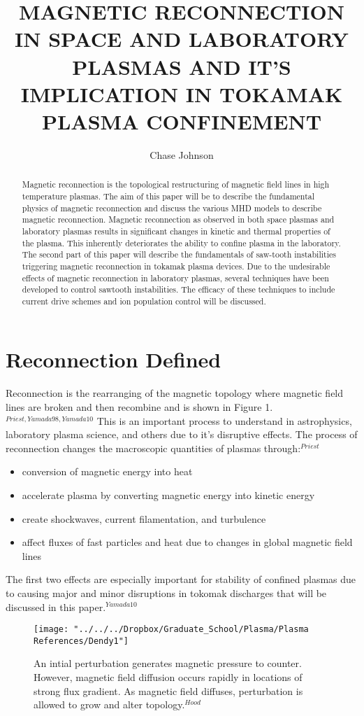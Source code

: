 \documentclass{article}
\begin{document}
\title{MAGNETIC RECONNECTION IN SPACE AND LABORATORY PLASMAS AND IT’S IMPLICATION IN TOKAMAK PLASMA CONFINEMENT}
\author{Chase Johnson}

\maketitle

\begin{abstract}
Magnetic reconnection is the topological restructuring of magnetic field lines in high temperature plasmas.    The aim of this paper will be to describe the fundamental physics of magnetic reconnection and discuss the various MHD models to describe magnetic reconnection.  Magnetic reconnection as observed in both space plasmas and laboratory plasmas results in significant changes in kinetic and thermal properties of the plasma.  This inherently deteriorates the ability to confine plasma in the laboratory.  The second part of this paper will describe the fundamentals of saw-tooth instabilities triggering magnetic reconnection in tokamak plasma devices.  Due to the undesirable effects of magnetic reconnection in laboratory plasmas, several techniques have been developed to control sawtooth instabilities.  The efficacy of these techniques to include current drive schemes and ion population control will be discussed.
\end{abstract}
\section{Reconnection Defined}
Reconnection is the rearranging of the magnetic topology where magnetic field lines are broken and then recombine and is shown in Figure 1.$^{Priest,Yamada98,Yamada10}$  This is an important process to understand in astrophysics, laboratory plasma science, and others due to it's disruptive effects.  The process of reconnection changes the macroscopic quantities of plasmas through:$^{Priest}$
\begin{itemize}
\item conversion of magnetic energy into heat
\item accelerate plasma by converting magnetic energy into kinetic energy
\item create shockwaves, current filamentation, and turbulence
\item affect fluxes of fast particles and heat due to changes in global magnetic field lines
\end{itemize}
The first two effects are especially important for stability of confined plasmas due to causing major and minor disruptions in tokomak discharges that will be discussed in this paper.$^{Yamada10}$
\begin{figure}[h]
\centering
\texttt{[image: "../../../Dropbox/Graduate\_School/Plasma/Plasma References/Dendy1"]}
\caption{An intial perturbation generates magnetic pressure to counter. However, magnetic field diffusion occurs rapidly in locations of strong flux gradient. As magnetic field diffuses, perturbation is allowed to grow and alter topology.$^{Hood}$}
\label{fig:Dendy1}
\end{figure}
\end{document}

